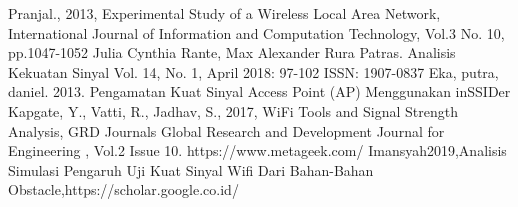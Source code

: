 \documentclass[conference]{IEEEtran}
\begin{document}
\begin{thebibliography}{00}
     Pranjal., 2013, Experimental Study of a Wireless Local Area Network, International Journal of Information and Computation Technology, Vol.3 No. 10, pp.1047-1052
     Julia Cynthia Rante, Max Alexander Rura Patras. Analisis Kekuatan Sinyal Vol. 14, No. 1, April 2018: 97-102 ISSN: 1907-0837
     Eka, putra, daniel. 2013. Pengamatan Kuat Sinyal Access Point (AP) Menggunakan inSSIDer
     Kapgate, Y., Vatti, R., Jadhav, S., 2017, WiFi Tools and Signal Strength Analysis, GRD Journals Global Research and Development Journal for Engineering , Vol.2 Issue 10.
     https://www.metageek.com/
     Imansyah2019,Analisis Simulasi Pengaruh Uji Kuat Sinyal Wifi Dari Bahan-Bahan Obstacle,https://scholar.google.co.id/
\end{thebibliography}
\end{document}
